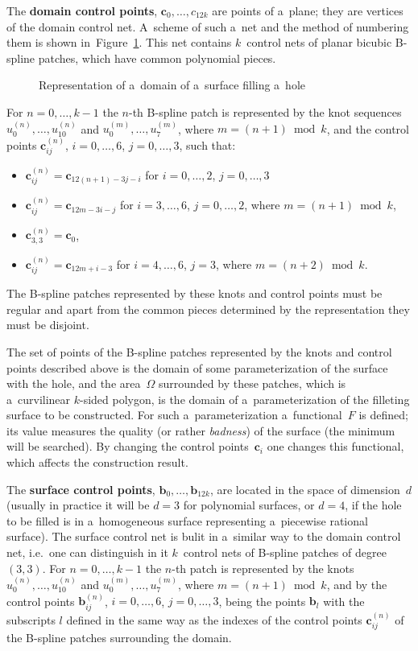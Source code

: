The \textbf{domain control points}, $\bm{c}_0,\ldots,c_{12k}$ are points of a~plane;
they are vertices of the
domain control net. A~scheme of such a~net and the method of numbering them
is shown in~Figure~\ref{fig:domain:cnet}. This net contains $k$~control nets
of planar bicubic B-spline patches, which have common polynomial pieces.%
\begin{figure}[ht]
  \centerline{}
  \caption{\label{fig:domain:cnet}Representation of a~domain of
    a~surface filling a~hole}
\end{figure}

For $n=0,\ldots,k-1$ the $n$-th B-spline patch is represented by the
knot sequences $u^{(n)}_0,\ldots,u^{(n)}_{10}$ and $u^{(m)}_0,\ldots,u^{(m)}_7$,
where $m=(n+1)\bmod k$, and the control points $\bm{c}^{(n)}_{ij}$, $i=0,\ldots,6$,
$j=0,\ldots,3$, such that:
\begin{itemize}
  \item $\bm{c}^{(n)}_{ij}=\bm{c}_{12(n+1)-3j-i}$ for $i=0,\ldots,2$, $j=0,\ldots,3$
  \item $\bm{c}^{(n)}_{ij}=\bm{c}_{12m-3i-j}$ for $i=3,\ldots,6$, $j=0,\ldots,2$,   
    where $m=(n+1)\bmod k$,
  \item $\bm{c}^{(n)}_{3,3}=\bm{c}_0$,
  \item $\bm{c}^{(n)}_{ij}=\bm{c}_{12m+i-3}$ for $i=4,\ldots,6$, $j=3$,
    where $m=(n+2)\bmod k$. 
\end{itemize}
The B-spline patches represented by these knots and control points must be 
regular and apart from the common pieces determined by the representation
they must be disjoint.

The set of points of the B-spline patches represented by the knots and
control points described above is the domain of some parameterization
of the surface with the hole, and the area~$\varOmega$ surrounded by
these patches, which is a~curvilinear $k$-sided polygon, is the domain of
a~parameterization of the filleting surface to be constructed. For such
a~parameterization a~functional~$F$ is defined; its value measures
the quality (or rather \emph{badness}) of the surface (the minimum will be
searched). By changing the control points~$\bm{c}_i$ one changes this
functional, which affects the construction result.

The \textbf{surface control points}, $\bm{b}_0,\ldots,\bm{b}_{12k}$, are located
in the space of dimension~$d$ (usually in practice it will be $d=3$ for polynomial
surfaces, or $d=4$, if the hole to be filled is in a~homogeneous surface
representing a~piecewise rational surface). The surface control net is
bulit in a~similar way to the domain control net, i.e.\ one can distinguish
in it $k$~control nets of B-spline patches of degree~$(3,3)$.
For $n=0,\ldots,k-1$ the $n$-th patch is represented by the knots
$u^{(n)}_0,\ldots,u^{(n)}_{10}$ and $u^{(m)}_0,\ldots,u^{(m)}_7$, where
$m=(n+1)\bmod k$, and by the control points $\bm{b}^{(n)}_{ij}$,
$i=0,\ldots,6$, $j=0,\ldots,3$, being the points $\bm{b}_l$ with the subscripts
$l$ defined in the same way as the indexes of the control points
$\bm{c}^{(n)}_{ij}$ of the B-spline patches surrounding the domain.

